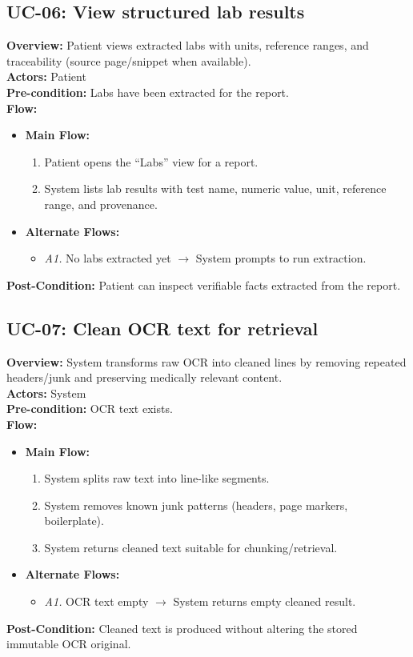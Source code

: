 \documentclass[12pt, a4paper]{article}
\begin{document}
\subsection*{UC-06: View structured lab results}
\textbf{Overview:} Patient views extracted labs with units, reference ranges, and traceability (source page/snippet when available). \\
\textbf{Actors:} Patient \\
\textbf{Pre-condition:} Labs have been extracted for the report. \\
\textbf{Flow:}
\begin{itemize}[leftmargin=*]
    \item \textbf{Main Flow:}
    \begin{enumerate}
        \item Patient opens the “Labs” view for a report.
        \item System lists lab results with test name, numeric value, unit, reference range, and provenance.
    \end{enumerate}
    \item \textbf{Alternate Flows:}
    \begin{itemize}
        \item \textit{A1.} No labs extracted yet $\rightarrow$ System prompts to run extraction.
    \end{itemize}
\end{itemize}
\textbf{Post-Condition:} Patient can inspect verifiable facts extracted from the report.

\subsection*{UC-07: Clean OCR text for retrieval}
\textbf{Overview:} System transforms raw OCR into cleaned lines by removing repeated headers/junk and preserving medically relevant content. \\
\textbf{Actors:} System \\
\textbf{Pre-condition:} OCR text exists. \\
\textbf{Flow:}
\begin{itemize}[leftmargin=*]
    \item \textbf{Main Flow:}
    \begin{enumerate}
        \item System splits raw text into line-like segments.
        \item System removes known junk patterns (headers, page markers, boilerplate).
        \item System returns cleaned text suitable for chunking/retrieval.
    \end{enumerate}
    \item \textbf{Alternate Flows:}
    \begin{itemize}
        \item \textit{A1.} OCR text empty $\rightarrow$ System returns empty cleaned result.
    \end{itemize}
\end{itemize}
\textbf{Post-Condition:} Cleaned text is produced without altering the stored immutable OCR original.
\end{document}
